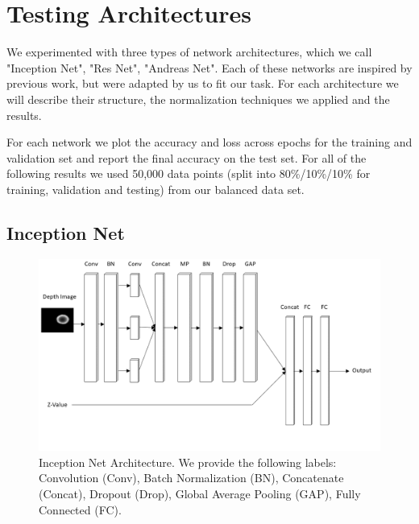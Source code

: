 
\section{Testing Architectures}
\label{sec:archs}

We experimented with three types of network architectures, which we call "Inception Net", "Res Net", "Andreas Net". 
Each of these networks are inspired by previous work, but were adapted by us to fit our task. 
For each architecture we will describe their structure, the normalization techniques we applied and the results. 
 


For each network we plot the accuracy and loss across epochs for the training and validation set and report the final accuracy on the test set. 
For all of the following results we used 50,000 data points (split into 80\%/10\%/10\% for training, validation and testing) from our balanced data set. 


\subsection{Inception Net}

\begin{figure}[t!]
    \includegraphics[width=0.99\columnwidth]{figs/inception_net.png}
\caption{Inception Net Architecture. We provide the following labels: Convolution (Conv), Batch Normalization (BN), Concatenate (Concat), Dropout (Drop), Global Average Pooling (GAP), Fully Connected (FC).} \label{fig:inception_net}
\end{figure}

